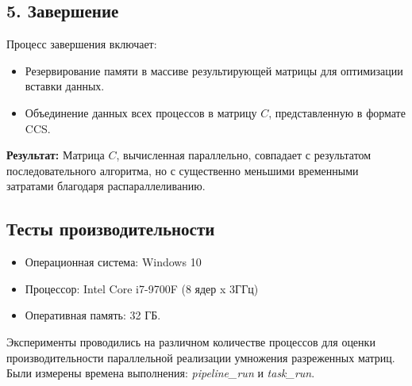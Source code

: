 \documentclass[12pt]{article}
\begin{document}
\subsection*{5. Завершение}
Процесс завершения включает:
\begin{itemize}
    \item Резервирование памяти в массиве результирующей матрицы для оптимизации вставки данных.
    \item Объединение данных всех процессов в матрицу \( C \), представленную в формате CCS.
\end{itemize}

\textbf{Результат:} Матрица \( C \), вычисленная параллельно, совпадает с результатом последовательного алгоритма, но с существенно меньшими временными затратами благодаря распараллеливанию.
\newpage

\subsection*{Тесты производительности}
\label{subsec:performance_tests}

\begin{itemize}
    \item Операционная система: Windows 10
    \item Процессор: Intel Core i7-9700F (8 ядер x 3ГГц)
    \item Оперативная память: 32 ГБ.
\end{itemize}

Эксперименты проводились на различном количестве процессов для оценки производительности параллельной реализации умножения разреженных матриц. Были измерены времена выполнения: \textit{pipeline\_run} и \textit{task\_run}.
\end{document}
